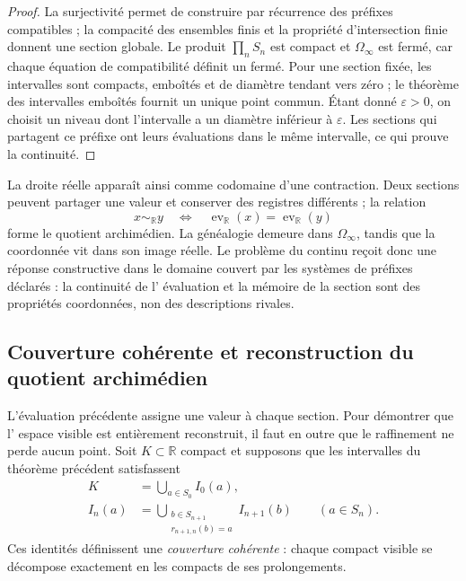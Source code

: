 \begin{proof}
La surjectivité permet de construire par récurrence des préfixes compatibles ; la
compacité des ensembles finis et la propriété d'intersection finie donnent
une section globale. Le produit \(\prod_nS_n\) est compact et
\(\Omega_\infty\) est fermé, car chaque équation de compatibilité définit un
fermé. Pour une section fixée, les intervalles sont compacts, emboîtés et de
diamètre tendant vers zéro ; le théorème des intervalles emboîtés fournit un
unique point commun. Étant donné \(\varepsilon>0\), on choisit un niveau dont l'intervalle
a un diamètre inférieur à \(\varepsilon\). Les sections qui partagent ce
préfixe ont leurs évaluations dans le même intervalle, ce qui prouve la
continuité.
\end{proof}

La droite réelle apparaît ainsi comme codomaine d'une contraction. Deux sections
peuvent partager une valeur et conserver des registres différents ; la relation
\[
 x\sim_{\mathbb R}y
 \quad\Longleftrightarrow\quad
 \operatorname{ev}_{\mathbb R}(x)=\operatorname{ev}_{\mathbb R}(y)
\]
forme le quotient archimédien. La généalogie demeure dans
\(\Omega_\infty\), tandis que la coordonnée vit dans son image réelle. Le problème
du continu reçoit donc une réponse constructive dans le domaine
couvert par les systèmes de préfixes déclarés : la continuité de l'
évaluation et la mémoire de la section sont des propriétés coordonnées, non des
descriptions rivales.

\subsection{Couverture cohérente et reconstruction du quotient archimédien}

L'évaluation précédente assigne une valeur à chaque section. Pour démontrer que l'
espace visible est entièrement reconstruit, il faut en outre que le
raffinement ne perde aucun point. Soit \(K\subset\mathbb R\) compact et supposons
que les intervalles du théorème précédent satisfassent
\begin{align}
 K&=\bigcup_{a\in S_0} I_0(a),
 \label{eq:cobertura-inicial-continuo-rev3}\\
 I_n(a)&=\bigcup_{\substack{b\in S_{n+1}\\r_{n+1,n}(b)=a}}I_{n+1}(b)
 \qquad(a\in S_n).
 \label{eq:cobertura-hijos-continuo-rev3}
\end{align}
Ces identités définissent une \emph{couverture cohérente} : chaque compact
visible se décompose exactement en les compacts de ses prolongements.

